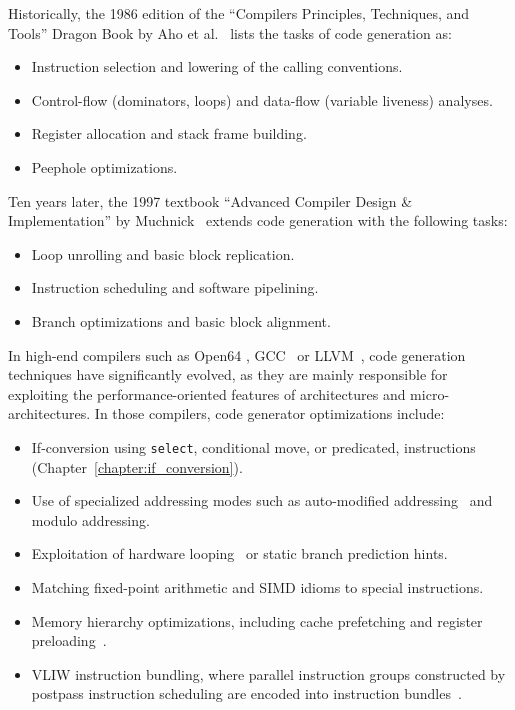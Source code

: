 Historically, the 1986 edition of the ``Compilers Principles, Techniques, and
Tools'' Dragon Book by Aho et al.~\cite{Aho:1986:Book} lists the tasks of code generation as:
\begin{itemize}
\item Instruction selection and lowering of the calling conventions.
\item Control-flow (dominators, loops) and data-flow (variable liveness) analyses.
\item Register allocation and stack frame building.
\item Peephole optimizations.
\end{itemize}
Ten years later, the 1997 textbook ``Advanced Compiler Design \& Implementation''
by Muchnick~\cite{Muchnick:1997:Book} extends code generation with the following tasks: \begin{itemize}
\item Loop unrolling and basic block replication.
\item Instruction scheduling and software pipelining.
\item Branch optimizations and basic block alignment.
\end{itemize}
In high-end compilers such as Open64
\cite{Chan:2008:Tutorial,Chapman:2013:IJPP}, GCC~\cite{Stallman:2017:GCC} or
LLVM~\cite{Lattner:2004:CGO}, code generation techniques have significantly evolved, as they are mainly responsible
for exploiting the performance-oriented features of architectures and
micro-architectures. In those compilers, code generator optimizations include:
\begin{itemize}
\item If-conversion using \texttt{select}, conditional move, or predicated, instructions (Chapter~\ref{chapter:if_conversion}).
\item Use of specialized addressing modes such as auto-modified addressing~\cite{Lee:2003:TODAES} and modulo
addressing.
\item Exploitation of hardware looping~\cite{Leupers:1997:Book} or static branch prediction hints.
\item Matching fixed-point arithmetic and SIMD idioms to special instructions.
\item Memory hierarchy optimizations, including cache prefetching and register preloading~\cite{Dinechin:1999:CC}.
\item VLIW instruction bundling, where parallel instruction groups constructed by postpass
instruction scheduling are encoded into instruction bundles~\cite{Kaestner:2001:LCTES}.
\end{itemize}

